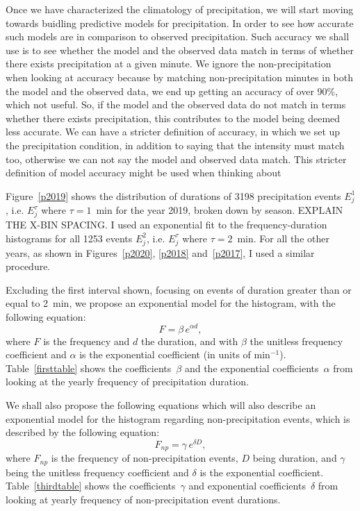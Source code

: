 \documentclass[11pt]{report}
\begin{document}
Once we have characterized the climatology of precipitation, we will start moving towards buidling predictive models for precipitation. In order to see how accurate such models are in comparison to observed precipitation. Such accuracy we shall use is to see whether the model and the observed data match in terms of whether there exists precipitation at a given minute. We ignore the non-precipitation when looking at accuracy because by matching non-precipitation minutes in both the model and the observed data, we end up getting an accuracy of over 90\%, which not useful. So, if the model and the observed data do not match in terms whether there exists precipitation, this contributes to the model being deemed less accurate. We can have a stricter definition of accuracy, in which we set up the precipitation condition, in addition to saying that the intensity must match too, otherwise we can not say the model and observed data match. This stricter definition of model accuracy might be used when thinking about 


Figure~\ref{p2019} shows the distribution of durations of 3198
precipitation events $E_j^1$, i.e. $E_j^\tau$ where $\tau=1$~min for
the year 2019, broken down by season. EXPLAIN THE X-BIN SPACING. 
I used an exponential fit to the
frequency-duration histograms for all 1253 events $E_j^2$,
i.e. $E_j^\tau$ where $\tau=2$~min. For all the other years, as shown
in Figures~\ref{p2020}, \ref{p2018} and~\ref{p2017}, I used a similar
procedure.

Excluding the first interval shown, focusing on events of duration
greater than or equal to 2~min, we propose an exponential model for
the histogram, with the following equation:
\begin{equation}\label{expod}
  F = \beta \,e^{\alpha d},
\end{equation}
where $F$ is the frequency and $d$ the duration, and with $\beta$ the
unitless frequency coefficient and $\alpha$ is the exponential
coefficient (in units of min$^{-1}$). Table~\ref{firsttable} shows the
coefficients~$\beta$ and the exponential coefficients~$\alpha$ from
looking at the yearly frequency of precipitation duration.

We shall also propose the following equations which will also describe an exponential model for the histogram regarding non-precipitation events, which is described by the following equation: 
\begin{equation}\label{expod_np}
	F_{np} = \gamma \,e^{\delta D},
\end{equation}
where $F_{np}$ is the frequency of non-precipitation events, $D$ being duration, and $\gamma $ being the unitless frequency coefficient and $\delta $ is the exponential coefficient. Table~\ref{thirdtable} shows the coefficients~$\gamma$ and exponential coefficients~$\delta$ from looking at yearly frequency of non-precipitation event durations. 
\end{document}
